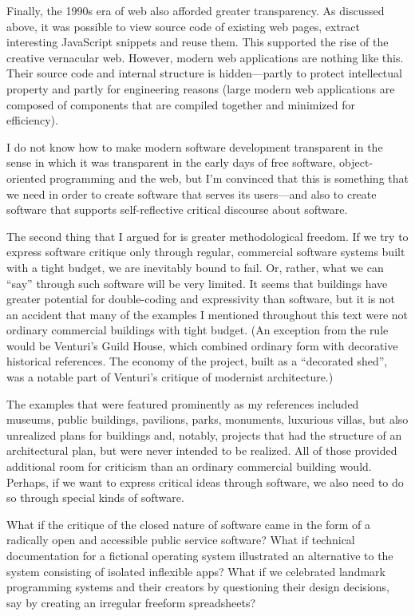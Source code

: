 Finally, the 1990s era of web also afforded greater transparency. As discussed above, it was
possible to view source code of existing web pages, extract interesting JavaScript snippets and
reuse them. This supported the rise of the creative vernacular web. However, modern web applications
are nothing like this. Their source code and internal structure is hidden---partly to protect
intellectual property and partly for engineering reasons (large modern web applications are
composed of components that are compiled together and minimized for efficiency).

I do not know how to make modern software development transparent in the sense in which it
was transparent in the early days of free software, object-oriented programming and the
web, but I'm convinced that this is something that we need in order to create software that
serves its users---and also to create software that supports self-reflective
critical discourse about software.

The second thing that I argued for is greater methodological freedom. If we try to express
software critique only through regular, commercial software systems built with a tight budget,
we are inevitably bound to fail. Or, rather, what we can ``say'' through such software
will be very limited. It seems that buildings have greater potential for double-coding and
expressivity than software, but it is not an accident that many of the examples I mentioned
throughout this text were not ordinary commercial buildings with tight budget. (An exception
from the rule would be Venturi's Guild House, which combined ordinary form with decorative
historical references. The economy of the project, built as a ``decorated shed'',
was a notable part of Venturi's critique of modernist architecture.)

The examples that were featured prominently as my references included museums, public buildings,
pavilions, parks, monuments, luxurious villas, but also unrealized plans for buildings
and, notably, projects that had the structure of an architectural plan, but were never
intended to be realized. All of those provided additional room for criticism than an
ordinary commercial building would. Perhaps, if we want to express critical ideas through
software, we also need to do so through special kinds of software.

What if the critique of the closed nature of software came in the form of a radically open
and accessible public service software? What if technical documentation for a fictional
operating system illustrated an alternative to the system consisting of isolated inflexible
apps? What if we celebrated landmark programming systems and their creators by questioning
their design decisions, say by creating an irregular freeform spreadsheets?

\newpage
\theendnotes
